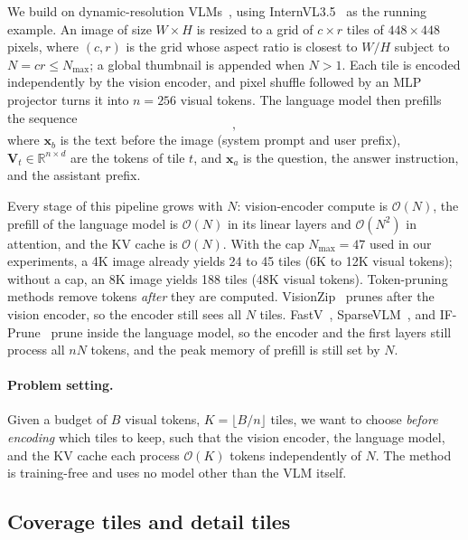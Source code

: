 We build on dynamic-resolution VLMs~\cite{internvl15}, using InternVL3.5~\cite{internvl35} as the running
example.
An image of size $W\times H$ is resized to a grid of $c\times r$ tiles of $448\times448$ pixels, where
$(c, r)$ is the grid whose aspect ratio is closest to $W/H$ subject to $N=cr\le N_{\max}$; a global
thumbnail is appended when $N>1$. Each tile is encoded independently by the vision encoder, and
pixel shuffle followed by an MLP projector turns it into $n=256$ visual tokens. The language model
then prefills the sequence
\begin{equation}
  [\,\mathbf{x}_b;\ \mathbf{V}_1;\ \dots;\ \mathbf{V}_{N+1};\ \mathbf{x}_a\,],
  \label{eq:seq}
\end{equation}
where $\mathbf{x}_b$ is the text before the image (system prompt and user prefix), $\mathbf{V}_t\in
\mathbb{R}^{n\times d}$ are the tokens of tile $t$, and $\mathbf{x}_a$ is the question, the answer
instruction, and the assistant prefix.

Every stage of this pipeline grows with $N$: vision-encoder compute is $\mathcal{O}(N)$, the prefill
of the language model is $\mathcal{O}(N)$ in its linear layers and $\mathcal{O}(N^2)$ in attention, and
the KV cache is $\mathcal{O}(N)$. With the cap $N_{\max}=47$ used in our experiments, a 4K image already
yields 24 to 45 tiles (6K to 12K visual tokens); without a cap, an 8K image yields 188 tiles (48K
visual tokens).
Token-pruning methods remove tokens \emph{after} they are computed. VisionZip~\cite{visionzip} prunes
after the vision encoder, so the encoder still sees all $N$ tiles. FastV~\cite{fastv},
SparseVLM~\cite{sparsevlm}, and IF-Prune~\cite{ifprune} prune inside the language model, so the
encoder and the first layers still process all $nN$ tokens, and the peak memory of prefill is still
set by $N$.

\paragraph{Problem setting.}
Given a budget of $B$ visual tokens, \ie $K=\lfloor B/n\rfloor$ tiles, we want to choose \emph{before
encoding} which tiles to keep, such that the vision encoder, the language model, and the KV cache
each process $\mathcal{O}(K)$ tokens independently of $N$. The method is training-free and uses no
model other than the VLM itself.

\subsection{Coverage tiles and detail tiles}
\label{sec:scales}

